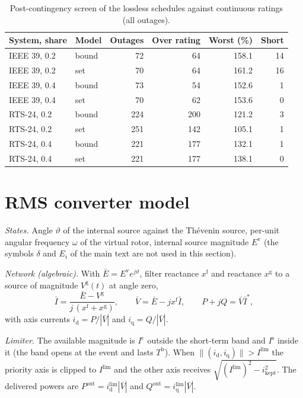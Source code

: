 \documentclass[11pt,a4paper]{article}
\begin{document}
\begin{table}[h]
  \caption{Post-contingency screen of the lossless schedules against
  continuous ratings (all outages).}
  \label{tab:screen}
  \centering
  \begin{tabular}{ll rrr r}
    \toprule
    System, share & Model & Outages & Over rating & Worst (\%) & Short \\
    \midrule
    IEEE 39, 0.2 & bound & 72 & 64 & 158.1 & 14 \\
    IEEE 39, 0.2 & set & 70 & 64 & 161.2 & 16 \\
    IEEE 39, 0.4 & bound & 73 & 54 & 152.6 & 1 \\
    IEEE 39, 0.4 & set & 70 & 62 & 153.6 & 0 \\
    RTS-24, 0.2 & bound & 224 & 200 & 121.2 & 3 \\
    RTS-24, 0.2 & set & 251 & 142 & 105.1 & 1 \\
    RTS-24, 0.4 & bound & 221 & 177 & 132.1 & 1 \\
    RTS-24, 0.4 & set & 221 & 177 & 138.1 & 0 \\
    \bottomrule
  \end{tabular}
\end{table}

\section{RMS converter model}
\label{s:rms}

\emph{States.} Angle $\vartheta$ of the internal source against the Th\'evenin
source, per-unit angular frequency $\omega$ of the virtual rotor, internal
source magnitude $E^{\mathrm{v}}$ (the symbols $\delta$ and $E_i$ of the main
text are not used in this section).

\emph{Network (algebraic).} With $\bar{E} = E^{\mathrm{v}} e^{j\vartheta}$, filter reactance
$x^{\mathrm{f}}$ and reactance $x^{\mathrm{g}}$ to a source of magnitude
$V^{\mathrm{g}}(t)$ at angle zero,
\begin{equation}
  \bar{I} = \frac{\bar{E} - V^{\mathrm{g}}}{j\,(x^{\mathrm{f}} + x^{\mathrm{g}})},
  \qquad \bar{V} = \bar{E} - j x^{\mathrm{f}} \bar{I},
  \qquad P + jQ = \bar{V}\bar{I}^{*} ,
\end{equation}
with axis currents $i_{\mathrm{d}} = P/|\bar{V}|$ and
$i_{\mathrm{q}} = Q/|\bar{V}|$.

\emph{Limiter.} The available magnitude is $I^{\mathrm{c}}$ outside the
short-term band and $I^{\mathrm{s}}$ inside it (the band opens at the event
and lasts $T^{\mathrm{b}}$). When $\lVert(i_{\mathrm{d}},
i_{\mathrm{q}})\rVert > I^{\lim}$ the priority axis is clipped to $I^{\lim}$
and the other axis receives $\sqrt{(I^{\lim})^2 - i^2_{\mathrm{kept}}}$. The
delivered powers are $P^{\mathrm{out}} = i^{\lim}_{\mathrm{d}}|\bar{V}|$ and
$Q^{\mathrm{out}} = i^{\lim}_{\mathrm{q}}|\bar{V}|$.
\end{document}
